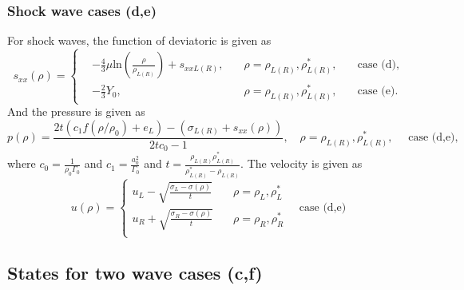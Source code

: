 \documentclass[review]{elsarticle}
\begin{document}
\subsubsection{Shock wave cases (d,e)}
For shock waves, the function of deviatoric is given as 
\begin{equation}
  s_{xx}(\rho) = \left\{\begin{aligned}
	  & -\frac{4}{3}\mu\text{ln}\left(\frac{\rho}{\rho_{L(R)}}\right)+s_{xxL(R)},\quad   &\rho =\rho_{L(R)},\rho_{L(R)}^*,
	\quad  &\text{case (d)},\\
	& -\frac{2}{3}Y_0,   \quad & \rho =\rho_{L(R)},\rho_{L(R)}^*, \quad
 &\text{case (e)}.
  \end{aligned} \right.
  \end{equation}
And the pressure is given as
\begin{equation}
  p(\rho)= 
  \frac{2t(c_1f(\rho/\rho_0)+e_L)-(\sigma_{L(R)}+s_{xx}(\rho))}{2tc_0-1}, \quad  \rho=\rho_{L(R)},\rho_{L(R)}^*, \quad 
  \text{ case (d,e)},
\end{equation}
where $c_0 = \frac{1}{\rho_0\Gamma_0}$ and $c_1 = \frac{a_0^2}{\Gamma_0}$ and $ t=\frac{\rho_{L(R)} \rho_{L(R)}^*}{\rho_{L(R)}^*-\rho_{L(R)}}$. 
The velocity is given as
\begin{equation}
  u(\rho) = \left\{ \begin{aligned}
	  u_L -\sqrt{\frac{\sigma_L-\sigma(\rho)}{t}} \quad &\rho =\rho_L, \rho_L^*\\ 
	  u_R +\sqrt{\frac{\sigma_R-\sigma(\rho)}{t}} \quad & \rho =\rho_R, \rho_R^*\\
  \end{aligned}
\right. \quad \text{case (d,e)}
\end{equation}

\subsection{States for two wave cases (c,f)}\label{sec:two}
\end{document}
